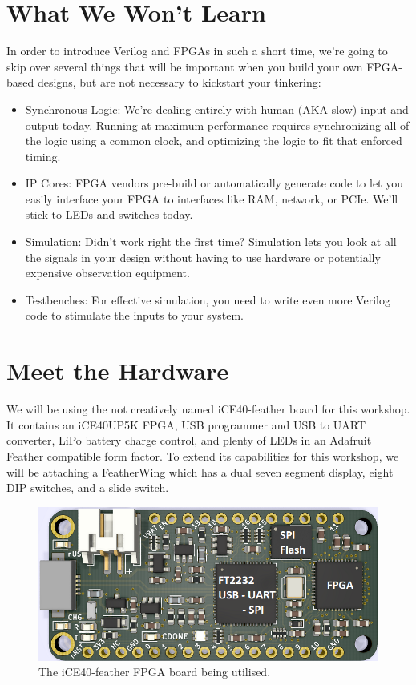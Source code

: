 \documentclass[12pt,a4paper]{article}
\begin{document}
\section{What We Won't Learn}
In order to introduce Verilog and FPGAs in such a short time, we’re going to skip over several things that will be important when you build your own FPGA-based designs, but are not necessary to kickstart your tinkering: 
\begin{itemize}
	\item Synchronous Logic: We’re dealing entirely with human (AKA slow) input and output today. Running at maximum performance requires synchronizing all of the logic using a common clock, and optimizing the logic to fit that enforced timing.
	\item IP Cores: FPGA vendors pre-build or automatically generate code to let you easily interface your FPGA to interfaces like RAM, network, or PCIe. We’ll stick to LEDs and switches today.
	\item Simulation: Didn’t work right the first time? Simulation lets you look at all the signals in your design without having to use hardware or potentially expensive observation equipment.
	\item Testbenches: For effective simulation, you need to write even more Verilog code to stimulate the inputs to your system.
\end{itemize}

\newpage
\section{Meet the Hardware}
We will be using the not creatively named iCE40-feather board for this workshop. It contains an iCE40UP5K FPGA, USB programmer and USB to UART converter, LiPo battery charge control, and plenty of LEDs in an Adafruit Feather compatible form factor. To extend its capabilities for this workshop, we will be attaching a FeatherWing which has a dual seven segment display, eight DIP switches, and a slide switch. 

\begin{figure}[H]
\begin{centering}
	\includegraphics[width=\linewidth]{top_render_annotated.PNG}
	\caption{The iCE40-feather FPGA board being utilised.}
\end{centering}
\end{figure}
\end{document}
